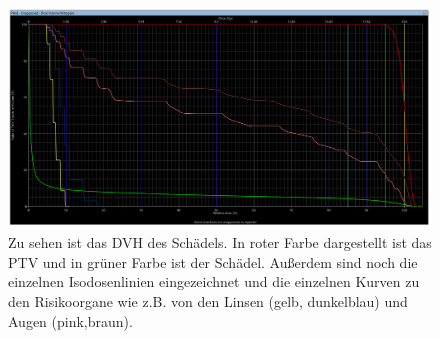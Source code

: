 \begin{figure}
	\centering
	\includegraphics[width=0.7\linewidth]{../Bilder/DVH_Einzel}
	\caption{Zu sehen ist das DVH des Schädels. In roter Farbe dargestellt ist das PTV und in grüner Farbe ist der Schädel. Außerdem sind noch die einzelnen Isodosenlinien eingezeichnet und die einzelnen Kurven zu den Risikoorgane wie z.B. von den Linsen (gelb, dunkelblau) und Augen (pink,braun).}
	\label{fig:dvheinzel}
\end{figure}
